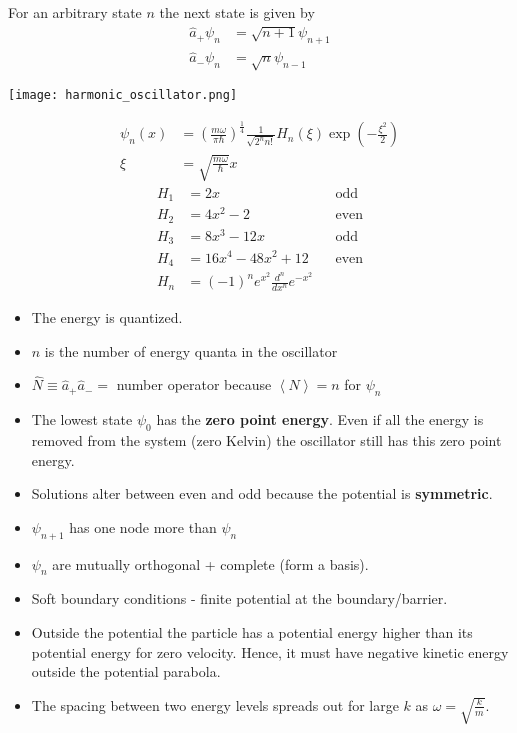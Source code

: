 For an arbitrary state $n$ the next state is given by
\begin{align*}
    \hat{a}_{+}\psi_n & = \sqrt{n+1}\psi_{n+1} \\
    \hat{a}_{-}\psi_n & = \sqrt{n}\psi_{n-1}
\end{align*}

\texttt{[image: harmonic\_oscillator.png]}


\noindent\begin{align*}
    \psi_n(x) & ={\left(\frac{m\omega}{\pi\hbar}\right)}^{\frac{1}{4}}\frac{1}{\sqrt{2^n n!}}H_n(\xi)\exp\left(-\frac{\xi^2}{2}\right) \\
    \xi       & =\sqrt{\frac{m\omega}{\hbar}}x
\end{align*}
{\tiny\noindent\begin{align*}
    H_1 & = 2x                                         &  & \text{odd}  \\
    H_2 & = 4x^2-2                                     &  & \text{even} \\
    H_3 & = 8x^3-12x                                   &  & \text{odd}  \\
    H_4 & = 16x^4-48x^2+12                             &  & \text{even} \\
    H_n & = {(-1)}^n e^{x^2} \frac{d^n}{dx^n} e^{-x^2}
\end{align*}
}

\begin{itemize}
    \item The energy is quantized.
    \item $n$ is the number of energy quanta in the oscillator
    \item $\widehat{N} \equiv \hat{a}_{+}\hat{a}_{-} = $ number operator because $\left<N\right> = n$ for $\psi_n$
    \item The lowest state $\psi_0$ has the \textbf{zero point energy}. Even if all the energy is removed from the system (zero Kelvin) the oscillator still has this zero point energy.
    \item Solutions alter between even and odd because the potential is \textbf{symmetric}.
    \item $\psi_{n+1}$ has one node more than $\psi_n$
    \item $\psi_n$ are mutually orthogonal + complete (form a basis).
    \item Soft boundary conditions - finite potential at the boundary/barrier.
    \item Outside the potential the particle has a potential energy higher than its potential energy for zero velocity. Hence, it must have negative kinetic energy outside the potential parabola.
    \item The spacing between two energy levels spreads out for large $k$ as $\omega=\sqrt{\frac{k}{m}}$.
\end{itemize}

